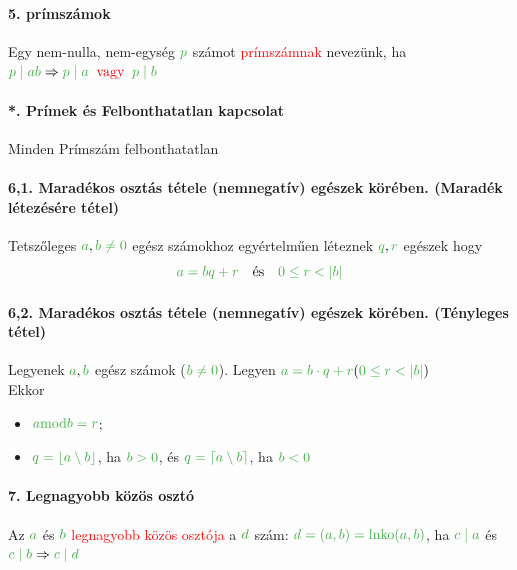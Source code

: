 \documentclass[10pt,a4paper]{article}
\renewcommand{\>}{\rightarrow}
\newcommand{\mmod}[2]{#1  \mid #2}
\newcommand{\red}[1]{\textcolor{red}{#1}}
\newcommand{\gr}[1]{\textcolor{FancsaliGreen}{#1}}
\newenvironment{m}
    {\begin{center}
    \begin{mdframed}[backgroundcolor=FancsaliBlue]
    }
    { 
    \end{mdframed}
    \end{center}
    }
\begin{document}
\paragraph{5. prímszámok}
\begin{m}
Egy nem-nulla, nem-egység $\gr{p}$ számot \red{prímszámnak} nevezünk, ha $\gr{p \;\lvert\; ab} \Rightarrow \gr{p\;\lvert\;a} \;\; \red{\text{vagy}} \; \; \gr{p\;\lvert\;b}$
\end{m}
\paragraph{*. Prímek és Felbonthatatlan kapcsolat}
\begin{m}
Minden Prímszám felbonthatatlan
\end{m}
\paragraph{6,1. Maradékos osztás tétele (nemnegatív) egészek körében. (Maradék létezésére tétel)}
\begin{m}
Tetszőleges $\gr{a},\gr{b \neq 0} $ egész számokhoz egyértelműen léteznek $\gr{q},\gr{r}$ egészek hogy
\[
\gr{a = bq+r } \quad \text{és} \quad \gr{0\leq r<\lvert b \lvert}
\]
\end{m}
\newpage
\paragraph{6,2. Maradékos osztás tétele (nemnegatív) egészek körében. (Tényleges tétel)}
\begin{m}
Legyenek $\gr{a},\gr{b}$ egész számok ($\gr{b\neq 0}$). Legyen $\gr{a = b\cdot q +r} (\gr{0\leq r < \lvert b \lvert})$ \\
Ekkor
\begin{itemize}
\item $\gr{a \text{mod} b = r}$;
\item $\gr{q = \lfloor a\setminus b\rfloor}$, ha $\gr{b>0}$, és $\gr{q = \lceil a\setminus b \rceil}$, ha $\gr{b<0}$
\end{itemize}
\end{m}
\paragraph{7. Legnagyobb közös osztó }
\begin{m}
Az $\gr{a}$ és $\gr{b}$ \red{legnagyobb közös osztója} a $\gr{d}$ szám: $\gr{d = (a,b)= \text{lnko}(a,b)}$, ha $\gr{c \; \lvert \; a}$ és $\gr{\mmod{c}{b}} \Rightarrow \gr{\mmod{c}{d}}$
\end{m}
\end{document}
